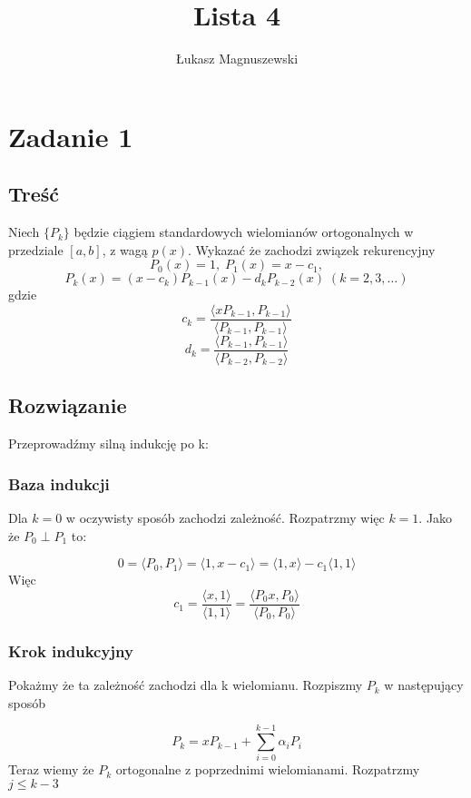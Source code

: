 \documentclass{article}
\title{Lista 4}
\author{Łukasz Magnuszewski}
\date{\vspace{-5ex}}
\begin{document}
\maketitle

\section*{Zadanie 1}
\subsection*{Treść}
Niech $ \{ P_k \}$ będzie ciągiem standardowych wielomianów ortogonalnych w przedziale $[a, b]$, z wagą $p(x)$. Wykazać że zachodzi związek rekurencyjny
\[ P_0(x) = 1, \; P_1(x) = x - c_1, \]
\[ P_k(x) = (x - c_k) P_{k-1}(x) - d_k P_{k-2}(x) \; (k = 2,3, \dots) \]
gdzie
\[ c_k = \frac{ \langle x P_{k-1}, P_{k-1}  \rangle}{\langle P_{k-1}, P_{k-1} \rangle } \] 
\[ d_k = \frac{ \langle  P_{k-1}, P_{k-1}  \rangle}{\langle P_{k-2}, P_{k-2} \rangle } \] 

\subsection*{Rozwiązanie}
Przeprowadźmy silną indukcję po k:


\subsubsection*{Baza indukcji}
Dla $k = 0$ w oczywisty sposób zachodzi zależność. Rozpatrzmy więc $k = 1$. Jako że $P_0 \perp P_1$ to:

\[ 
    0 = \langle P_0 , P_1 \rangle=  \langle 1, x - c_1 \rangle   = \langle 1 , x \rangle - c_1  \langle 1, 1 \rangle
\]
Więc 
\[
    c_1 = \frac{\langle x , 1 \rangle}{\langle 1,1 \rangle } =    \frac{\langle P_0 x , P_0 \rangle}{\langle P_0,P_0 \rangle } 
\]

\subsubsection*{Krok indukcyjny}
Pokażmy że ta zależność zachodzi dla k wielomianu. Rozpiszmy $P_k$ w następujący sposób

\[
   P_k = x P_{k-1} + \sum_{i=0}^{k-1} \alpha_i P_i
\]
Teraz wiemy że $P_k$ ortogonalne z poprzednimi wielomianami. Rozpatrzmy $j \leq k-3 $
\end{document}
